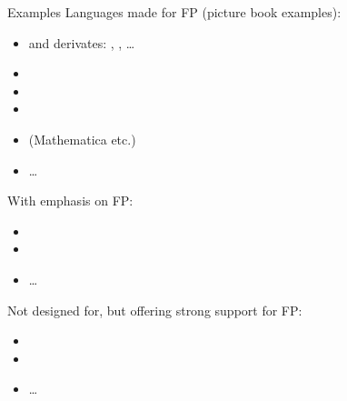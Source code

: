 \begin{frame}{Examples}
	Languages made for FP (picture book examples):
	\begin{itemize}
		\item {} and derivates: , , \dots
		\item {}
		\item {}
		\item {}
		\item {} (Mathematica etc.)
		\item \dots
	\end{itemize}
	With emphasis on FP:
	\begin{itemize}
		\item {}
		\item {}
		\item \dots
	\end{itemize}
	Not designed for, but offering strong support for FP:
	\begin{itemize}
		\item {} 
		\item {}
		\item \dots
	\end{itemize}
\end{frame}

%	
%

